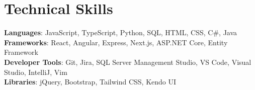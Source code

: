 \documentclass[letterpaper,11pt]{article}
\begin{document}
%
\section{Technical Skills}
 \begin{itemize}[leftmargin=0.15in, label={}]
    \small{\item{
     \textbf{Languages}{: JavaScript, TypeScript, Python, SQL, HTML, CSS, C\#, Java} \\
     \textbf{Frameworks}{: React, Angular, Express, Next.js, ASP.NET Core, Entity Framework} \\
     \textbf{Developer Tools}{: Git, Jira, SQL Server Management Studio, VS Code, Visual Studio, IntelliJ, Vim} \\
     \textbf{Libraries}{: jQuery, Bootstrap, Tailwind CSS, Kendo UI}
    }}
 \end{itemize}


\end{document}
